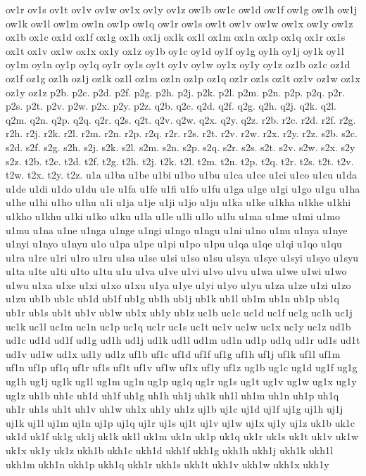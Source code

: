 {ov1r
ov1s
ov1t
ov1v
ov1w
ov1x
ov1y
ov1z
ow1b
ow1c
ow1d
ow1f
ow1g
ow1h
ow1j
ow1k
ow1l
ow1m
ow1n
ow1p
ow1q
ow1r
ow1s
ow1t
ow1v
ow1w
ow1x
ow1y
ow1z
ox1b
ox1c
ox1d
ox1f
ox1g
ox1h
ox1j
ox1k
ox1l
ox1m
ox1n
ox1p
ox1q
ox1r
ox1s
ox1t
ox1v
ox1w
ox1x
ox1y
ox1z
oy1b
oy1c
oy1d
oy1f
oy1g
oy1h
oy1j
oy1k
oy1l
oy1m
oy1n
oy1p
oy1q
oy1r
oy1s
oy1t
oy1v
oy1w
oy1x
oy1y
oy1z
oz1b
oz1c
oz1d
oz1f
oz1g
oz1h
oz1j
oz1k
oz1l
oz1m
oz1n
oz1p
oz1q
oz1r
oz1s
oz1t
oz1v
oz1w
oz1x
oz1y
oz1z
p2b.
p2c.
p2d.
p2f.
p2g.
p2h.
p2j.
p2k.
p2l.
p2m.
p2n.
p2p.
p2q.
p2r.
p2s.
p2t.
p2v.
p2w.
p2x.
p2y.
p2z.
q2b.
q2c.
q2d.
q2f.
q2g.
q2h.
q2j.
q2k.
q2l.
q2m.
q2n.
q2p.
q2q.
q2r.
q2s.
q2t.
q2v.
q2w.
q2x.
q2y.
q2z.
r2b.
r2c.
r2d.
r2f.
r2g.
r2h.
r2j.
r2k.
r2l.
r2m.
r2n.
r2p.
r2q.
r2r.
r2s.
r2t.
r2v.
r2w.
r2x.
r2y.
r2z.
s2b.
s2c.
s2d.
s2f.
s2g.
s2h.
s2j.
s2k.
s2l.
s2m.
s2n.
s2p.
s2q.
s2r.
s2s.
s2t.
s2v.
s2w.
s2x.
s2y
s2z.
t2b.
t2c.
t2d.
t2f.
t2g.
t2h.
t2j.
t2k.
t2l.
t2m.
t2n.
t2p.
t2q.
t2r.
t2s.
t2t.
t2v.
t2w.
t2x.
t2y.
t2z.
u1a
u1ba
u1be
u1bi
u1bo
u1bu
u1ca
u1ce
u1ci
u1co
u1cu
u1da
u1de
u1di
u1do
u1du
u1e
u1fa
u1fe
u1fi
u1fo
u1fu
u1ga
u1ge
u1gi
u1go
u1gu
u1ha
u1he
u1hi
u1ho
u1hu
u1i
u1ja
u1je
u1ji
u1jo
u1ju
u1ka
u1ke
u1kha
u1khe
u1khi
u1kho
u1khu
u1ki
u1ko
u1ku
u1la
u1le
u1li
u1lo
u1lu
u1ma
u1me
u1mi
u1mo
u1mu
u1na
u1ne
u1nga
u1nge
u1ngi
u1ngo
u1ngu
u1ni
u1no
u1nu
u1nya
u1nye
u1nyi
u1nyo
u1nyu
u1o
u1pa
u1pe
u1pi
u1po
u1pu
u1qa
u1qe
u1qi
u1qo
u1qu
u1ra
u1re
u1ri
u1ro
u1ru
u1sa
u1se
u1si
u1so
u1su
u1sya
u1sye
u1syi
u1syo
u1syu
u1ta
u1te
u1ti
u1to
u1tu
u1u
u1va
u1ve
u1vi
u1vo
u1vu
u1wa
u1we
u1wi
u1wo
u1wu
u1xa
u1xe
u1xi
u1xo
u1xu
u1ya
u1ye
u1yi
u1yo
u1yu
u1za
u1ze
u1zi
u1zo
u1zu
ub1b
ub1c
ub1d
ub1f
ub1g
ub1h
ub1j
ub1k
ub1l
ub1m
ub1n
ub1p
ub1q
ub1r
ub1s
ub1t
ub1v
ub1w
ub1x
ub1y
ub1z
uc1b
uc1c
uc1d
uc1f
uc1g
uc1h
uc1j
uc1k
uc1l
uc1m
uc1n
uc1p
uc1q
uc1r
uc1s
uc1t
uc1v
uc1w
uc1x
uc1y
uc1z
ud1b
ud1c
ud1d
ud1f
ud1g
ud1h
ud1j
ud1k
ud1l
ud1m
ud1n
ud1p
ud1q
ud1r
ud1s
ud1t
ud1v
ud1w
ud1x
ud1y
ud1z
uf1b
uf1c
uf1d
uf1f
uf1g
uf1h
uf1j
uf1k
uf1l
uf1m
uf1n
uf1p
uf1q
uf1r
uf1s
uf1t
uf1v
uf1w
uf1x
uf1y
uf1z
ug1b
ug1c
ug1d
ug1f
ug1g
ug1h
ug1j
ug1k
ug1l
ug1m
ug1n
ug1p
ug1q
ug1r
ug1s
ug1t
ug1v
ug1w
ug1x
ug1y
ug1z
uh1b
uh1c
uh1d
uh1f
uh1g
uh1h
uh1j
uh1k
uh1l
uh1m
uh1n
uh1p
uh1q
uh1r
uh1s
uh1t
uh1v
uh1w
uh1x
uh1y
uh1z
uj1b
uj1c
uj1d
uj1f
uj1g
uj1h
uj1j
uj1k
uj1l
uj1m
uj1n
uj1p
uj1q
uj1r
uj1s
uj1t
uj1v
uj1w
uj1x
uj1y
uj1z
uk1b
uk1c
uk1d
uk1f
uk1g
uk1j
uk1k
uk1l
uk1m
uk1n
uk1p
uk1q
uk1r
uk1s
uk1t
uk1v
uk1w
uk1x
uk1y
uk1z
ukh1b
ukh1c
ukh1d
ukh1f
ukh1g
ukh1h
ukh1j
ukh1k
ukh1l
ukh1m
ukh1n
ukh1p
ukh1q
ukh1r
ukh1s
ukh1t
ukh1v
ukh1w
ukh1x
ukh1y
}
